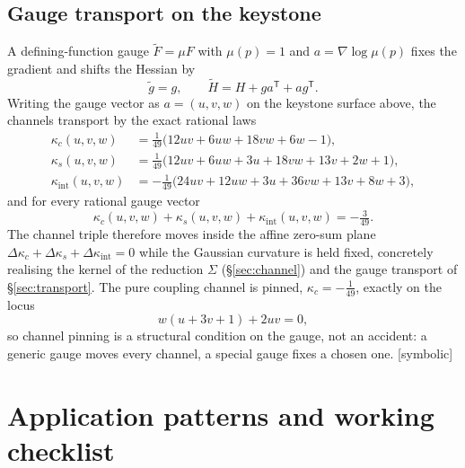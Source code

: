 \documentclass[11pt]{article}
\newcommand{\Symbolic}{\textsf{[symbolic]}}
\theoremstyle{plain}
\theoremstyle{definition}
\newcommand{\kc}{\kappa_{c}}
\newcommand{\kint}{\kappa_{\mathrm{int}}}
\newcommand{\ks}{\kappa_{s}}
\begin{document}
\subsection{Gauge transport on the keystone}
A defining-function gauge $\widetilde F=\mu F$ with $\mu(p)=1$ and $a=\nabla\log\mu(p)$ fixes the
gradient and shifts the Hessian by
\[
\widetilde g=g,\qquad \widetilde H=H+ga^{\mathsf T}+ag^{\mathsf T}.
\]
Writing the gauge vector as $a=(u,v,w)$ on the keystone surface above, the channels transport by the
exact rational laws
\begin{align*}
\kc(u,v,w)&=\tfrac1{49}\bigl(12uv+6uw+18vw+6w-1\bigr),\\
\ks(u,v,w)&=\tfrac1{49}\bigl(12uv+6uw+3u+18vw+13v+2w+1\bigr),\\
\kint(u,v,w)&=-\tfrac1{49}\bigl(24uv+12uw+3u+36vw+13v+8w+3\bigr),
\end{align*}
and for every rational gauge vector
\[
\kc(u,v,w)+\ks(u,v,w)+\kint(u,v,w)=-\tfrac3{49}.
\]
The channel triple therefore moves inside the affine zero-sum plane
$\Delta\kc+\Delta\ks+\Delta\kint=0$ while the Gaussian curvature is held fixed, concretely realising
the kernel of the reduction $\Sigma$ (\S\ref{sec:channel}) and the gauge transport of
\S\ref{sec:transport}. The pure coupling channel is pinned, $\kc=-\tfrac1{49}$, exactly on the locus
\[
w(u+3v+1)+2uv=0,
\]
so channel pinning is a structural condition on the gauge, not an accident: a generic gauge moves
every channel, a special gauge fixes a chosen one. \Symbolic

\section{Application patterns and working checklist}
\label{app:patterns}
\end{document}

